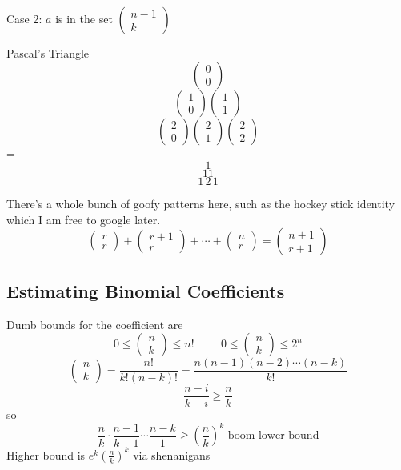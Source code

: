 \documentclass{report}
\begin{document}
Case 2: $a$ is in the set $\begin{pmatrix} n-1 \\ k \end{pmatrix}$

Pascal's Triangle
\[
\begin{pmatrix} 0 \\ 0 \end{pmatrix}
\]
\[
\begin{pmatrix} 1 \\ 0 \end{pmatrix} 
\begin{pmatrix} 1 \\ 1 \end{pmatrix} 
\]
\[
\begin{pmatrix} 2 \\ 0 \end{pmatrix}
\begin{pmatrix} 2 \\ 1 \end{pmatrix}
\begin{pmatrix} 2 \\ 2 \end{pmatrix} 
\]
=
\[
1
\]
\[
1 1
\]
\[
1 \, 2 \, 1
\]

There's a whole bunch of goofy patterns here, such as the hockey stick identity which I am free to google later.
\[
\begin{pmatrix} r \\ r \end{pmatrix} +
\begin{pmatrix} r+1 \\ r \end{pmatrix} 
+
\cdots
+
\begin{pmatrix} n \\ r \end{pmatrix} =
\begin{pmatrix} n+1 \\ r+1 \end{pmatrix}
\]

\newpage
\subsection*{Estimating Binomial Coefficients}
Dumb bounds for the coefficient are 
\[
0 \leq \begin{pmatrix} n \\ k \end{pmatrix} \leq n! \hspace{1cm}
0 \leq \begin{pmatrix} n \\ k \end{pmatrix} \leq 2^n
\]
\[
\begin{pmatrix} n \\ k \end{pmatrix} = \frac{n!}{k!(n-k)!} = \frac{n(n-1)(n-2)\cdots(n-k)}{k!}
\]
\[
\frac{n-i}{k-i} \geq \frac{n}{k}
\]
so
\[
\frac{n}{k} \cdot \frac{n-1}{k-1} \cdots \frac{n-k}{1} \geq \left( \frac{n}{k} \right)^k
\textrm{ boom lower bound}
\]
Higher bound is $e^k\left( \frac{n}{k} \right)^k$ via shenanigans
\end{document}
